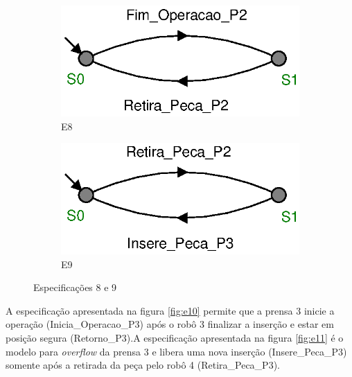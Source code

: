 \begin{figure}[H]%
  \centering
  \begin{subfigure}{0.45\textwidth}
      \centering
      \includegraphics[width=\textwidth]{imagens/E8.eps}
      \caption{E8}
      \label{fig:e8}
  \end{subfigure}
  \hfill
  \begin{subfigure}{0.45\textwidth}
      \centering
      \includegraphics[width=\textwidth]{imagens/E9.eps}
      \caption{E9}
      \label{fig:e9}
  \end{subfigure}
  \caption{Especificações 8 e 9}
  \label{fig:e89}
\end{figure}

A especificação apresentada na figura \ref{fig:e10} permite que a prensa 3 inicie a operação (Inicia\_Operacao\_P3) após o robô 3 finalizar a inserção e estar em posição segura (Retorno\_P3).A especificação apresentada na figura \ref{fig:e11} é o modelo para \textit{overflow} da prensa 3 e libera uma nova inserção (Insere\_Peca\_P3) somente após a retirada da peça pelo robô 4 (Retira\_Peca\_P3).


